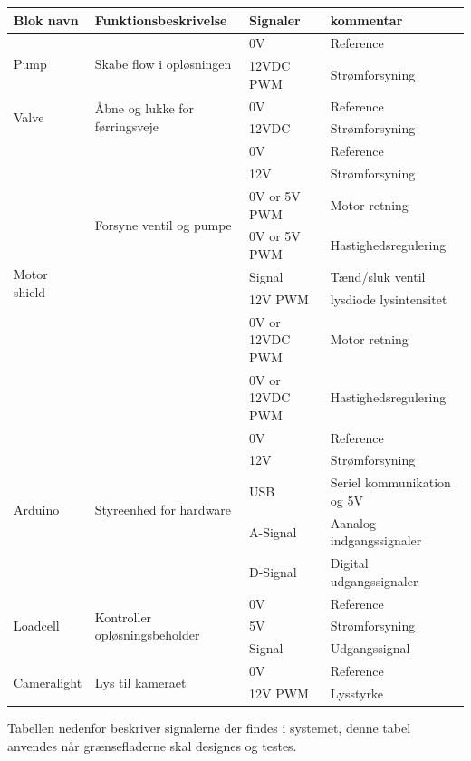 \begin{center}
		\begin{longtable}{ | m{1.750cm} | m{4.750cm}| m{3.5cm}| m{4.5cm}| } 
			\hline
			\textbf{Blok navn} &\textbf{Funktionsbeskrivelse} &\textbf{Signaler} &\textbf{kommentar}\\ 
			\hline
			\multirow{2}{*}{Pump} & \multirow{2}{*}{Skabe flow i opløsningen} & 0V & Reference \\ 
& & 12VDC PWM & Strømforsyning \\	
			\hline	
			\multirow{2}{*}{Valve} & \multirow{2}{*}{Åbne og lukke for førringsveje} & 0V & Reference \\ 
& & 12VDC & Strømforsyning \\	
			\hline	
		\multirow{8}{*}{Motor shield} & \multirow{6}{*}{Forsyne ventil og pumpe} & 0V & Reference \\ 
& & 12V & Strømforsyning \\	
& & 0V or 5V PWM & Motor retning \\	
& & 0V or 5V PWM & Hastighedsregulering \\
& & Signal & Tænd/sluk ventil \\
& & 12V PWM & lysdiode lysintensitet \\
& & 0V or 12VDC PWM & Motor retning \\	
& & 0V or 12VDC PWM & Hastighedsregulering \\
			\hline	
			\multirow{5}{*}{Arduino} & \multirow{5}{*}{Styreenhed for hardware} & 0V & Reference \\ 
& & 12V & Strømforsyning \\	
& & USB & Seriel kommunikation og 5V \\
& & A-Signal & Aanalog indgangssignaler \\
& & D-Signal & Digital udgangssignaler \\
			\hline
			\multirow{3}{*}{Loadcell} & \multirow{3}{*}{Kontroller opløsningsbeholder} & 0V & Reference \\ 
& & 5V & Strømforsyning \\	
& & Signal & Udgangssignal \\	
			\hline
			\multirow{2}{*}{Cameralight} & \multirow{2}{*}{Lys til kameraet} & 0V & Reference \\ 
& & 12V PWM & Lysstyrke \\	
			\hline
		\end{longtable}
	\end{center}
	
\newpage
Tabellen nedenfor beskriver signalerne der findes i systemet, denne tabel anvendes når grænsefladerne skal designes og testes.

